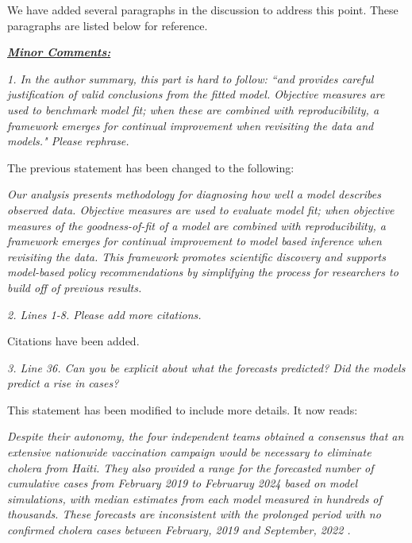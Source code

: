\documentclass[11pt]{article}
\newcommand\report[1]{{\color{mygreen} \vspace{1mm}\hspace{0.25in}\parbox{6in}{\em #1}}}
\newcommand\article[1]{{\color{blue} \vspace{1mm}\hspace{0.25in}\parbox{6in}{\em #1}}}
\begin{document}
We have added several paragraphs in the discussion to address this point. These paragraphs are listed below for reference.

\article{\editDiscussionOne}

\article{\editDiscussionTwo}

\article{\editDiscussionThree}

\article{\editDiscussionFour}

\article{\editDiscussionFive}

\article{\editDiscussionSix}

\report{
  \textbf{\underline{Minor Comments:}}
}

\report{
  1. In the author summary, this part is hard to follow: ``and provides careful justification of valid conclusions from the fitted model. Objective measures are used to benchmark model fit; when these are combined with reproducibility, a framework emerges for continual improvement when revisiting the data and models." Please rephrase.
}

The previous statement has been changed to the following:

\article{Our analysis presents methodology for diagnosing how well a model describes observed data. Objective measures are used to evaluate model fit; when objective measures of the goodness-of-fit of a model are combined with reproducibility, a framework emerges for continual improvement to model based inference when revisiting the data. This framework promotes scientific discovery and supports model-based policy recommendations by simplifying the process for researchers to build off of previous results.}

\report{
  2. Lines 1-8. Please add more citations.
}

Citations have been added. 

\report{
  3. Line 36. Can you be explicit about what the forecasts predicted? Did the models predict a rise in cases?
}

This statement has been modified to include more details. It now reads:

\article{Despite their autonomy, the four independent teams obtained a consensus that an extensive nationwide vaccination campaign would be necessary to eliminate cholera from Haiti. They also provided a range for the forecasted number of cumulative cases from February 2019 to Februaruy 2024 based on model simulations, with median estimates from each model measured in hundreds of thousands.
These forecasts are inconsistent with the prolonged period with no confirmed cholera cases between February, 2019 and September, 2022 \cite{trevisin22}.}
\end{document}
